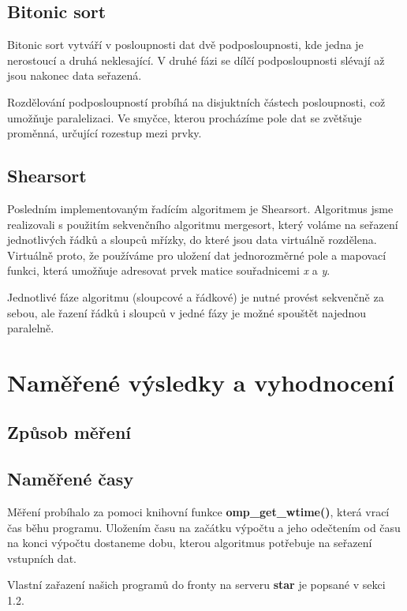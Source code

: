\documentclass[12pt]{article}
\begin{document}
\subsection{Bitonic sort}
Bitonic sort vytváří v posloupnosti dat dvě podposloupnosti, kde jedna je nerostoucí a druhá neklesající.
V druhé fázi se dílčí podposloupnosti slévají až jsou nakonec data seřazená.

Rozdělování podposloupností probíhá na disjuktních částech posloupnosti, což umožňuje paralelizaci.
Ve smyčce, kterou procházíme pole dat se zvětšuje proměnná, určující rozestup mezi prvky.

\subsection{Shearsort}
Posledním implementovaným řadícím algoritmem je Shearsort. Algoritmus jsme realizovali 
s použitím sekvenčního algoritmu mergesort, který voláme na seřazení jednotlivých řádků a sloupců
mřízky, do které jsou data virtuálně rozdělena. Virtuálně proto, že používáme pro uložení dat jednorozměrné
pole a mapovací funkci, která umožňuje adresovat prvek matice souřadnicemi \emph{x} a \emph{y}.

Jednotlivé fáze algoritmu (sloupcové a řádkové) je nutné provést sekvenčně za sebou,
ale řazení řádků i sloupců v jedné fázy je možné spouštět najednou paralelně.

\section{Naměřené výsledky a vyhodnocení}
\subsection{Způsob měření}

\subsection{Naměřené časy}
Měření probíhalo za pomoci knihovní funkce \textbf{omp\_get\_wtime()}, která vrací čas běhu programu.
Uložením času na začátku výpočtu a jeho odečtením od času na konci výpočtu dostaneme dobu, kterou
algoritmus potřebuje na seřazení vstupních dat.

Vlastní zařazení našich programů do fronty na serveru \textbf{star} je popsané v sekci 1.2.
\end{document}
